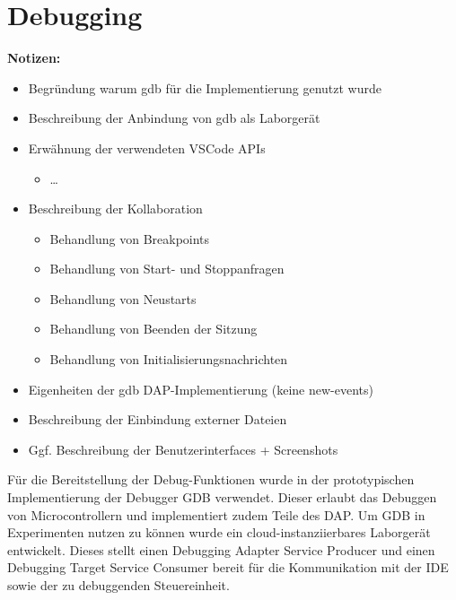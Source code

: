 \section{Debugging}\label{section:prototypische-implementierung:debugging}

\begin{note}
    \textbf{Notizen:}
    \begin{itemize}
        \item Begründung warum gdb für die Implementierung genutzt wurde
        \item Beschreibung der Anbindung von gdb als Laborgerät
        \item Erwähnung der verwendeten VSCode APIs
              \begin{itemize}
                  \item \dots
              \end{itemize}
        \item Beschreibung der Kollaboration
              \begin{itemize}
                  \item Behandlung von Breakpoints
                  \item Behandlung von Start- und Stoppanfragen
                  \item Behandlung von Neustarts
                  \item Behandlung von Beenden der Sitzung
                  \item Behandlung von Initialisierungsnachrichten
              \end{itemize}
        \item Eigenheiten der gdb DAP-Implementierung (keine new-events)
        \item Beschreibung der Einbindung externer Dateien
        \item Ggf. Beschreibung der Benutzerinterfaces + Screenshots
    \end{itemize}
\end{note}

Für die Bereitstellung der Debug-Funktionen wurde in der prototypischen Implementierung der Debugger \ac{GDB} \cite{noauthor_gdb_nodate} verwendet. Dieser erlaubt das Debuggen von Microcontrollern und implementiert zudem Teile des \ac{DAP}. Um \ac{GDB} in Experimenten nutzen zu können wurde ein cloud-instanziierbares Laborgerät entwickelt. Dieses stellt einen Debugging Adapter Service Producer und einen Debugging Target Service Consumer bereit für die Kommunikation mit der IDE sowie der zu debuggenden Steuereinheit.

